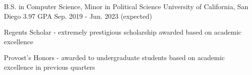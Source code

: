 

\begin{cventries}

    \cventry
    {B.S. in Computer Science, Minor in Political Science} %
    {University of California, San Diego} %
    {3.97 GPA} %
    {Sep. 2019 - Jun. 2023 (expected)} %
    {
      \begin{cvitems} %
        \item {Regents Scholar - extremely prestigious scholarship awarded based on academic excellence}
        \item {Provost's Honors - awarded to undergraduate students based on academic excellence in previous quarters}
      \end{cvitems}
    }

\end{cventries}
